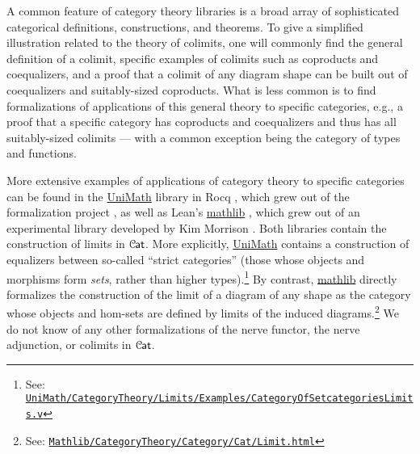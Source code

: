 \documentclass[a4paper,UKenglish,cleveref, autoref, thm-restate]{lipics-v2021}
\newcommand{\cat}[1]{\textup{\textsf{#1}}}%
\newcommand{\1}{\mathbbe{1}}
\newcommand{\2}{\mathbbe{2}}
\newcommand{\3}{\mathbbe{3}}
\newcommand{\Cat}{\mathcal{C}{\kern-.75pt}\cat{at}}
\newcommand{\libmathlib}{\href{https://github.com/leanprover-community/mathlib}{\textsf{mathlib}}}
\newcommand{\libunimath}{\href{https://github.com/UniMath/UniMath}{\textsf{UniMath}}}
\begin{document}
A common feature of category theory libraries is a broad array of sophisticated categorical definitions, constructions, and theorems. To give a simplified illustration related to the theory of colimits, one will commonly find the general definition of a colimit, specific examples of colimits such as coproducts and coequalizers, and a proof that a colimit of any diagram shape can be built out of coequalizers and suitably-sized coproducts. What is less common is to find formalizations of applications of this general theory to specific categories, e.g., a proof that a specific category has coproducts and coequalizers and thus has all suitably-sized colimits --- with a common exception being the category of types and functions.

More extensive examples of applications of category theory to specific categories can be found in the \libunimath{} library in Rocq \cite{UniMath}, which grew out of the formalization project \cite{AKS-Univalent}, as well as Lean's \libmathlib{} \cite{mathlib2020}, which grew out of an experimental library developed by Kim Morrison \cite{Morrison}. Both libraries contain the construction of limits in $\Cat$. More explicitly, \libunimath{} contains a construction of equalizers between so-called ``strict categories'' (those whose objects and morphisms form \emph{sets}, rather than higher types).\footnote{See: \href{https://github.com/UniMath/UniMath/blob/master/UniMath/CategoryTheory/Limits/Examples/CategoryOfSetcategoriesLimits.v}{\tt UniMath/CategoryTheory/Limits/Examples/CategoryOfSetcategoriesLimits.v}} By contrast, \libmathlib{} directly formalizes the construction of the limit of a diagram of any shape as the category whose objects and hom-sets are defined by limits of the induced diagrams.\footnote{See: \href{https://leanprover-community.github.io/mathlib4_docs/Mathlib/CategoryTheory/Category/Cat/Limit.html}{\tt Mathlib/CategoryTheory/Category/Cat/Limit.html}} We do not know of any other formalizations of the nerve functor, the nerve adjunction, or colimits in $\Cat$.
\end{document}
